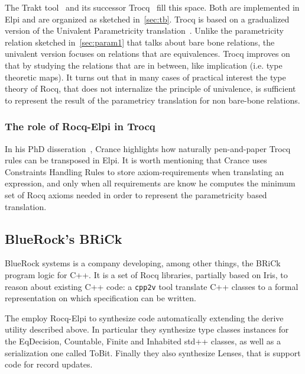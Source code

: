 \documentclass[a4paper, 11pt]{book}
\begin{document}
The Trakt tool~\cite{DBLP:conf/cpp/Blot0CPKMV23} and its successor
Trocq~\cite{10.1007/978-3-031-57262-3_10} fill this space. Both
are implemented in Elpi and are organized as sketched in~\cref{sec:tb}.
Trocq is based on a gradualized version of the Univalent Parametricity
translation~\cite{10.1145/3429979}. Unlike the parametricity relation
sketched in~\cref{sec:param1} that talks about bare bone relations, the univalent
version focuses on relations that are equivalences.
Trocq improves on that by studying the relations that are in between,
like implication (i.e. type theoretic maps).
It turns out that in many cases of practical interest the type
theory of Rocq, that does not internalize the principle of univalence, is
sufficient to represent the result of the parametricy translation
for non bare-bone relations.

\subsubsection{The role of Rocq-Elpi in Trocq}

In his PhD disseration~\cite[Page 115]{enzo}, Crance
highlights how naturally pen-and-paper Trocq rules can be transposed in Elpi.
It is worth mentioning that Crance uses Constraints Handling Rules to
store axiom-requirements when translating an expression, and only when
all requirements are know he computes the minimum set of Rocq axioms
needed in order to represent the parametricity based translation.



\subsection{BlueRock's BRiCk}

BlueRock systems is a company developing, among other things, the BRiCk
program logic for C++. It is a set of Rocq libraries, partially based on Iris,
to reason about existing C++ code: a \texttt{cpp2v} tool translate C++
classes to a formal representation on which specification can be written.

The employ Rocq-Elpi to synthesize code automatically extending the
derive utility described above. In particular they synthesize
type classes instances for the EqDecision, Countable, Finite and Inhabited
std++ classes, as well as a serialization one called ToBit. Finally
they also synthesize Lenses, that is support code for record updates.
\end{document}
